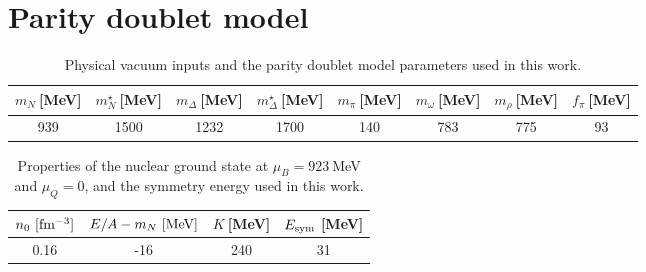 \documentclass[preprint,showkeys,lengthcheck,nofootinbib,twocolumn,notitlepage,floatfix,superscriptaddress]{revtex4-1}
\begin{document}
\section{Parity doublet model}
\label{sec:pd_model}

\begin{table*}[t!]\begin{center}\begin{tabular}{|c|c|c|c|c|c|c|c|}
  \hline
  $m_N~$[MeV] & $m_N^\star~$[MeV] & $m_\Delta~$[MeV] & $m_\Delta^\star~$[MeV] & $m_\pi~$[MeV]  & $m_\omega~$[MeV] & $m_\rho~$[MeV] & $f_\pi~$[MeV] \\ \hline\hline
  939   & 1500  & 1232 & 1700 & 140       & 783        & 775 & 93  \\ \hline
  \end{tabular}\end{center}
  \caption{Physical vacuum inputs and the parity doublet model parameters used in this work.}
  \label{tab:vacuum_params}
\end{table*}

\begin{table*}[t!]\begin{center}\begin{tabular}{|c|c|c|c|}
  \hline
  $n_0~[\rm fm^{-3}]$ & $E/A- m_N~[\rm MeV]$ & $K~$[MeV] & $E_{\rm sym}~$[MeV] \\ \hline\hline
  0.16                   & -16                    & 240       & 31 \\ \hline
  \end{tabular}\end{center}
  \caption{Properties of the nuclear ground state at $\mu_B=923~$MeV and $\mu_Q=0$, and the symmetry energy used in this work.}
  \label{tab:vacuum_params2}
\end{table*}
\end{document}
